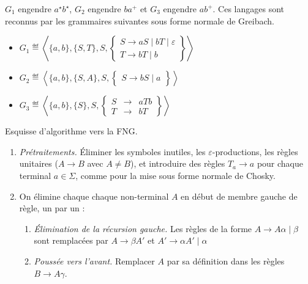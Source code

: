 \begin{corrections}

  \begin{questions}

  \item $G_1$ engendre $a^\star b^\star$, $G_2$ engendre $b a^+$ et $G_3$ engendre $a b^+$. Ces langages sont reconnus par les grammaires suivantes sous forme normale de Greibach. 
    \begin{itemize}

    \item $G_1 \eqdef \left\langle \{a,b\}, \{S,T\}, S,
      \left\{\begin{array}{l}
      S \rightarrow a S \mid b T \mid \varepsilon\\
      T \rightarrow b T \mid b
      \end{array}\right\}\right\rangle$

    \item $G_2 \eqdef \left\langle \{a,b\}, \{S,A\}, S,
      \left\{\begin{array}{l}
      S \rightarrow b S \mid a
      \end{array}\right\}\right\rangle$

    \item $G_3 \eqdef \left\langle \{a,b\}, \{S\}, S,
      \left\{\begin{array}{rcl}
      S &\rightarrow& a T b \\
      T &\rightarrow& b T
      \end{array}\right\}\right\rangle$

    \end{itemize}
    
  \item Esquisse d'algorithme vers la FNG.
    \begin{enumerate}
    \item \emph{Prétraitements.} Éliminer les symboles inutiles, les $\varepsilon$-productions,
      les règles unitaires ($A\rightarrow B$ avec $A\neq B$),
      et introduire des règles $T_a\rightarrow a$ pour chaque terminal $a\in\Sigma$, 
      comme pour la mise sous forme normale de Chosky.
    \item On élimine chaque chaque non-terminal $A$ en début de membre gauche de règle, un par un : 
      \begin{enumerate}
      \item \emph{Élimination de la récursion gauche.}
        Les règles de la forme $A \rightarrow A\alpha \mid \beta$ sont remplacées par $A \rightarrow \beta A'$ et $A' \rightarrow \alpha A' \mid \alpha$
      \item \emph{Poussée vers l'avant.} Remplacer $A$ par sa définition dans les règles $B \rightarrow A \gamma$.
      \end{enumerate}
    \end{enumerate}
    

\end{questions}
\end{corrections}

